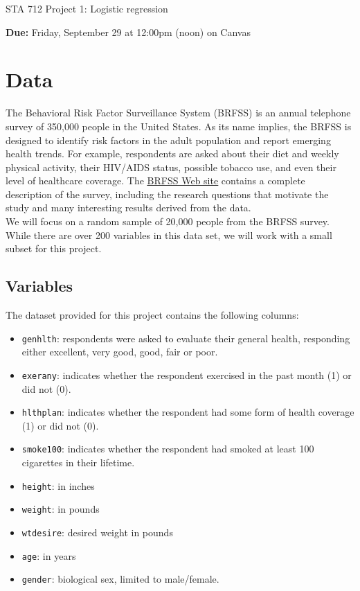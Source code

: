 \documentclass[11pt]{article}
\begin{document}
\begin{center}
\Large
STA 712 Project 1: Logistic regression\\
\normalsize
\vspace{5mm}
\end{center}

\noindent \textbf{Due:} Friday, September 29 at 12:00pm (noon) on Canvas

\section*{Data}

The Behavioral Risk Factor Surveillance System (BRFSS) is an annual telephone survey of 350,000 people in the United States. As its name implies, the BRFSS is designed to identify risk factors in the adult population and report emerging health trends. For example, respondents are asked about their diet and weekly physical activity, their HIV/AIDS status, possible tobacco use, and even their level of healthcare coverage. The \href{https://www.cdc.gov/brfss/}{\underline{BRFSS Web site}} contains a complete description of the survey, including the research questions that motivate the study and many interesting results derived from the data.\\

\noindent We will focus on a random sample of 20,000 people from the BRFSS survey. While there are over 200 variables in this data set, we will work with a small subset for this project.

\subsection*{Variables}

The dataset provided for this project contains the following columns:

\begin{itemize}
\item \verb;genhlth;: respondents were asked to evaluate their general health, responding either excellent, very good, good, fair or poor.
\item \verb;exerany;: indicates whether the respondent exercised in the past month (1) or did not (0).
\item \verb;hlthplan;: indicates whether the respondent had some form of health coverage (1) or did not (0).
\item \verb;smoke100;: indicates whether the respondent had smoked at least 100 cigarettes in their lifetime.
\item \verb;height;: in inches
\item \verb;weight;: in pounds
\item \verb;wtdesire;: desired weight in pounds
\item \verb;age;: in years
\item \verb;gender;: biological sex, limited to male/female.
\end{itemize}
\end{document}
